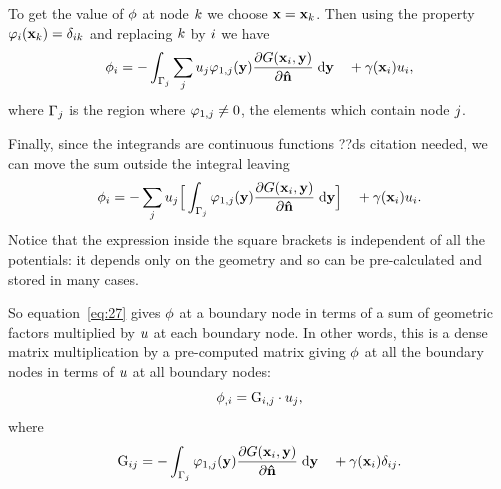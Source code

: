 To get the value of $\phi$ at node ${k}$ we choose $\mathbf{x} = \mathbf{x}_{k}$. Then using the property $\varphi_{i}(\mathbf{x}_{k}) = \delta_{{i} {k}}$ and replacing ${k}$ by ${i}$ we have
\begin{equation}
  \phim_{\ibasis} =
  - \int_{\boundd_\ibasisb} \sum_\ibasisb \phione_{\ibasisb} \tbf_{1,\ibasisb}(\yv)
  \pd{\Green[\ibasis]}{\nv} \d \yv
  \quad + \gamma(\xv_\ibasis) \phione_{\ibasis},
  \label{eq:colocation}
\end{equation}
where ${{\Gamma}_{j}}$ is the region where $\varphi_{1,{j}} \neq 0$, \ie the elements which contain node ${j}$.

Finally, since the integrands are continuous functions ??ds citation needed, we can move the sum outside the integral leaving
\begin{equation}
  \phim_{\ibasis} =
  - \sum_\ibasisb \phione_{\ibasisb} \Big[ \int_{\boundd_\ibasisb} \tbf_{1,\ibasisb}(\yv)
  \pd{\Green[\ibasis]}{\nv} \d \yv \Big]
  \quad + \gamma(\xv_\ibasis) \phione_{\ibasis}.
\label{eq:27}
\end{equation}
Notice that the expression inside the square brackets is independent of all the potentials: it depends only on the geometry and so can be pre-calculated and stored in many cases.

So equation~\eqref{eq:27} gives $\phi$ at a boundary node in terms of a sum of geometric factors multiplied by $u$ at each boundary node.
In other words, this is a dense matrix multiplication by a pre-computed matrix giving $\phi$ at all the boundary nodes in terms of $u$ at all boundary nodes:
\begin{equation}
  \label{eq:10}
  \phim_{,\ibasis} = \bm_{\ibasis,\ibasisb} \cdot \phione_{\ibasisb},
\end{equation}
where
\begin{equation}
  \label{eq:17}
  \bm_{\ibasis\ibasisb} = - \int_{\boundd_\ibasisb} \tbf_{1,\ibasisb}(\yv) \pd{\Green[\ibasis]}{\nv} \d \yv
  \quad + \gamma(\xv_\ibasis)\delta_{\ibasis\ibasisb}.
\end{equation}



